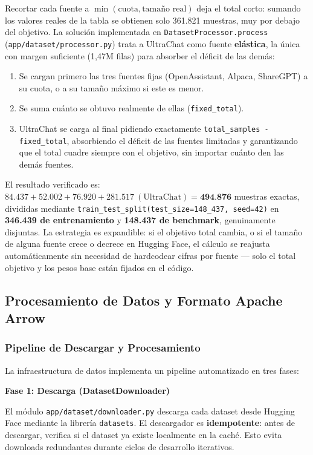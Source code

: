 Recortar cada fuente a $\min(\text{cuota}, \text{tamaño real})$ deja el total corto: sumando los valores reales de la tabla se obtienen solo 361.821 muestras, muy por debajo del objetivo. La solución implementada en \texttt{DatasetProcessor.process} (\texttt{app/dataset/processor.py}) trata a UltraChat como fuente \textbf{elástica}, la única con margen suficiente (1,47M filas) para absorber el déficit de las demás:

\begin{enumerate}
    \item Se cargan primero las tres fuentes fijas (OpenAssistant, Alpaca, ShareGPT) a su cuota, o a su tamaño máximo si este es menor.
    \item Se suma cuánto se obtuvo realmente de ellas (\texttt{fixed\_total}).
    \item UltraChat se carga al final pidiendo exactamente \texttt{total\_samples - fixed\_total}, absorbiendo el déficit de las fuentes limitadas y garantizando que el total cuadre siempre con el objetivo, sin importar cuánto den las demás fuentes.
\end{enumerate}

El resultado verificado es: $84.437 + 52.002 + 76.920 + 281.517~(\text{UltraChat}) = \textbf{494.876}$ muestras exactas, divididas mediante \texttt{train\_test\_split(test\_size=148\_437, seed=42)} en \textbf{346.439 de entrenamiento} y \textbf{148.437 de benchmark}, genuinamente disjuntas. La estrategia es expandible: si el objetivo total cambia, o si el tamaño de alguna fuente crece o decrece en Hugging Face, el cálculo se reajusta automáticamente sin necesidad de hardcodear cifras por fuente --- solo el total objetivo y los pesos base están fijados en el código.

\subsection{Procesamiento de Datos y Formato Apache Arrow}

\subsubsection{Pipeline de Descargar y Procesamiento}

La infraestructura de datos implementa un pipeline automatizado en tres fases:

\textbf{Fase 1: Descarga (DatasetDownloader)}

El módulo \texttt{app/dataset/downloader.py} descarga cada dataset desde Hugging Face mediante la librería \texttt{datasets}. El descargador es \textbf{idempotente}: antes de descargar, verifica si el dataset ya existe localmente en la caché. Esto evita downloads redundantes durante ciclos de desarrollo iterativos.

